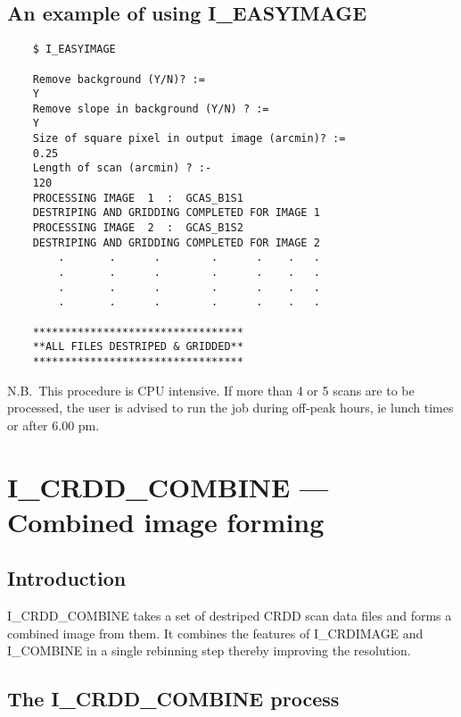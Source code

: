 \pagebreak

\subsection{An example of using I\_EASYIMAGE}

\begin {verbatim}
    $ I_EASYIMAGE

    Remove background (Y/N)? :=
    Y                  
    Remove slope in background (Y/N) ? :=
    Y
    Size of square pixel in output image (arcmin)? :=
    0.25
    Length of scan (arcmin) ? :-
    120
    PROCESSING IMAGE  1  :  GCAS_B1S1 
    DESTRIPING AND GRIDDING COMPLETED FOR IMAGE 1 
    PROCESSING IMAGE  2  :  GCAS_B1S2 
    DESTRIPING AND GRIDDING COMPLETED FOR IMAGE 2 
        .       .      .        .      .    .   .
        .       .      .        .      .    .   .
        .       .      .        .      .    .   .
        .       .      .        .      .    .   .

    ********************************* 
    **ALL FILES DESTRIPED & GRIDDED** 
    ********************************* 
\end{verbatim}
N.B.\ This procedure is CPU intensive.
If more than 4 or 5 scans are to be processed, the user is advised to run the
job during off-peak hours, ie lunch times or after 6.00 pm.
\pagebreak

\section{I\_CRDD\_COMBINE --- Combined image forming}

\subsection {Introduction}

I\_CRDD\_COMBINE takes a set of destriped CRDD scan data files and forms a 
combined image from them. It combines the features of I\_CRDIMAGE and I\_COMBINE
in a single rebinning step thereby improving the resolution.

\subsection {The I\_CRDD\_COMBINE process}

